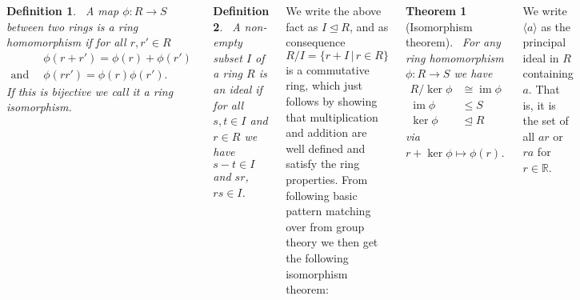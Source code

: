 \documentclass{tikzposter} %
\DeclareMathOperator{\im}{im}
\newtheorem{theorem}{Theorem}
\newtheorem{definition}{Definition}
\begin{document}
\begin{columns}
{    \begin{definition}
    \ A map $\phi : R \to S$ between two rings is a ring homomorphism if for all $r, r' \in R$
      \begin{align*}
        & \phi(r+r') = \phi(r) + \phi(r') \\
        \text{and }\, & \phi(rr') = \phi(r)\phi(r').
      \end{align*}
      If this is bijective we call it a ring isomorphism.
    \end{definition}
    \hphantom{}

    \begin{definition}
    \ A non-empty subset $I$ of a ring $R$ is an ideal if for all $s, t \in I$ and $r \in R$ we have $s - t \in I$ and $sr$, $rs \in I$.
  \end{definition}
  \hphantom{}

    We write the above fact as $I \trianglelefteq R$, and as consequence $R / I = \{r + I \,|\, r \in R\}$ is a commutative ring, which just follows by showing that multiplication and addition are well defined and satisfy the ring properties. From following basic pattern matching over from group theory we then get the following isomorphism theorem:\\

   \begin{theorem}[Isomorphism theorem]
   \ For any ring homomorphism $\phi : R \to S$ we have
     \begin{align*}
       R / \ker \phi &\cong \im \phi \\
       \im \phi &\le S \\
       \ker \phi &\trianglelefteq R
     \end{align*}
     via $r + \ker \phi \mapsto \phi(r)$.
   \end{theorem}
   \hphantom{}

   We write $\langle a \rangle$ as the principal ideal in $R$ containing $a$. That is, it is the set of all $ar$ or $ra$ for $r \in \mathbb{R}$. \\

   }
\end{columns}
\end{document}
